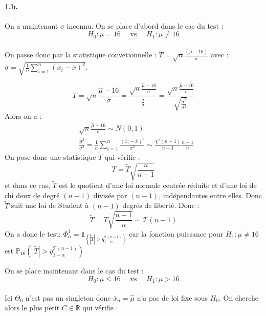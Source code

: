 \documentclass[a4paper,10pt]{report}
\begin{document}

\paragraph{1.b.} On a maintenant $\sigma$ inconnu. On se place d'abord dans le cas du test : 
$$
H_{0}: \mu=16 \quad \text { vs } \quad H_1 : \mu \neq 16
$$\\
On passe donc par la statistique convetionnelle : $T = \sqrt{n} \frac{(\hat{\mu} - 16)}{\hat{\sigma}}$ avec : $\hat{\sigma}=\sqrt{\frac{1}{n} \sum_{i=1}^{n}\left(x_{i}-\bar{x}\right)^{2}}$.

$$
T=\sqrt{n} \frac{\hat{\mu}-16}{\hat{\sigma}}=\frac{\sqrt{n} \frac{\hat{\mu}-16}{\sigma}}{\frac{\hat{\sigma}}{\sigma}}=\frac{\sqrt{n} \frac{\hat{\mu}-16}{\sigma}}{\sqrt{\frac{\hat{\sigma}^{2}}{\sigma^{2}}}}
$$
Alors on a :
$$
\begin{aligned}
& \sqrt{n} \frac{\hat{\mu}-16}{\sigma} \sim N(0,1) \\
& \frac{\hat{\sigma}^{2}}{\sigma^{2}} = \frac{1}{n} \sum_{i=1}^{n} \frac{\left(x_{i}-\bar{x}\right)^{2}}{\sigma^2} \sim \frac{\chi^{2}(n-1)}{n-1} \frac{n-1}{n}
\end{aligned}
$$
On pose donc une statistique $\tilde{T}$ qui vérifie :
$$
T = \tilde{T}\sqrt{\frac{n}{n-1}}
$$
et dans ce cas, $\tilde{T}$ est le quotient d'une loi normale centrée réduite et d'une loi de chi deux de degré $(n-1)$ divisée par $(n-1)$, indépendantes entre elles. Donc $\tilde{T}$ suit une loi de Student à $(n-1)$ degrés de liberté. Donc :
$$
\tilde{T} = T  \sqrt{\frac{n-1}{n}} \sim \mathcal{T}(n-1)
$$
On a donc le test: $\Phi_\alpha^1 = \mathds{1}_{\left\{   | \tilde{T} | > q_{1-\alpha}^{\mathcal{T}(n-1)}  \right\}    }$ car la fonction puissance pour $H_1 : \mu \neq 16$ est $\mathbb{P}_{16} \left( | \tilde{T} | > q_{1-\alpha}^{\mathcal{T}(n-1)}  \right)$\\
\newline





On se place maintenant dans le cas du test :
$$
H_{0}: \mu \leq 16 \quad \text { vs } \quad H_1 : \mu > 16
$$\\
Ici $\Theta_0$ n'est pas un singleton donc $\bar{x}_n = \hat{\mu}$ n'a pas de loi fixe sous $H_0$. On cherche alors le plus petit $C \in \mathbb{R}$ qui vérifie :
\end{document}
